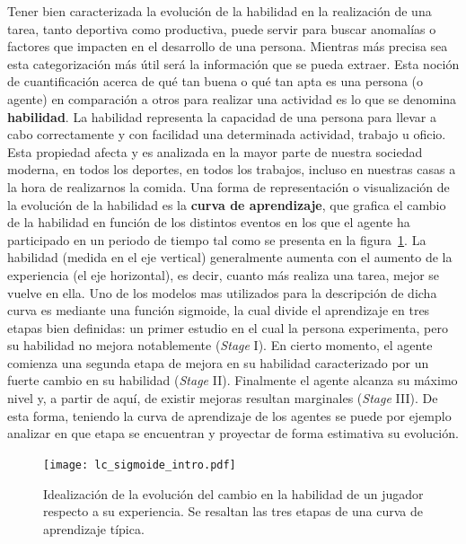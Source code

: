 \documentclass[11pt,twoside,spanish]{report} %
\begin{document}
Tener bien caracterizada la evoluci\'on de la habilidad en la realizaci\'on de una tarea, tanto deportiva como productiva, puede servir para buscar anomal\'ias o factores que impacten en el desarrollo de una persona.
Mientras m\'as precisa sea esta categorizaci\'on m\'as \'util ser\'a la informaci\'on que se pueda extraer.
Esta noci\'on de cuantificaci\'on acerca de qu\'e tan buena o qu\'e tan apta es una persona (o agente) en comparaci\'on a otros para realizar una actividad es lo que se denomina \textbf{habilidad}.
La habilidad representa la capacidad de una persona para llevar a cabo correctamente y con facilidad una determinada actividad, trabajo u oficio.
Esta propiedad afecta y es analizada en la mayor parte de nuestra sociedad moderna, en todos los deportes, en todos los trabajos, incluso en nuestras casas a la hora de realizarnos la comida.
Una forma de representaci\'on o visualizaci\'on de la evoluci\'on de la habilidad es la \textbf{curva de aprendizaje}, que grafica el cambio de la habilidad en funci\'on de los distintos eventos en los que el agente ha participado en un periodo de tiempo tal como se presenta en la figura~\ref{fig:lc_sigmoide_intro}.
La habilidad (medida en el eje vertical) generalmente aumenta con el aumento de la experiencia (el eje horizontal), es decir, cuanto m\'as realiza una tarea, mejor se vuelve en ella.
Uno de los modelos mas utilizados para la descripci\'on de dicha curva es mediante una funci\'on sigmoide, la cual divide el aprendizaje en tres etapas bien definidas: un primer estudio en el cual la persona experimenta, pero su habilidad no mejora notablemente (\textit{Stage} I).
En cierto momento, el agente comienza una segunda etapa de mejora en su habilidad caracterizado por un fuerte cambio en su habilidad (\textit{Stage} II).
Finalmente el agente alcanza su m\'aximo nivel y, a partir de aqu\'i, de existir mejoras resultan marginales (\textit{Stage} III).
De esta forma, teniendo la curva de aprendizaje de los agentes se puede por ejemplo analizar en que etapa se encuentran y proyectar de forma estimativa su evoluci\'on.
\begin{figure} %
	\texttt{[image: lc\_sigmoide\_intro.pdf]}
	\caption{Idealizaci\'on de la evoluci\'on del cambio en la habilidad de un jugador respecto a su experiencia. Se resaltan las tres etapas de una curva de aprendizaje t\'ipica.}
	\label{fig:lc_sigmoide_intro}
\end{figure}
\end{document}
